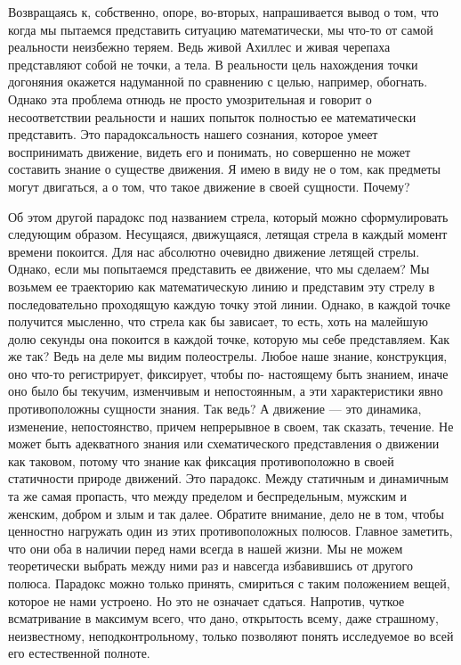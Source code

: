 Возвращаясь к, собственно, опоре, во-вторых, напрашивается вывод о том, что
когда мы пытаемся представить ситуацию математически, мы что-то от самой
реальности неизбежно теряем. Ведь живой Ахиллес и живая черепаха представляют
собой не точки, а тела. В реальности цель нахождения точки догоняния окажется
надуманной по сравнению с целью, например, обогнать. Однако эта проблема отнюдь
не просто умозрительная и говорит о несоответствии реальности и наших попыток
полностью ее математически представить. Это парадоксальность нашего сознания,
которое умеет воспринимать движение, видеть его и понимать, но совершенно не
может составить знание о существе движения. Я имею в виду не о том, как предметы
могут двигаться, а о том, что такое движение в своей сущности. Почему? 

Об этом
другой парадокс под названием стрела, который можно сформулировать следующим
образом. Несущаяся, движущаяся, летящая стрела в каждый момент времени покоится.
Для нас абсолютно очевидно движение летящей стрелы. Однако, если мы попытаемся
представить ее движение, что мы сделаем? Мы возьмем ее траекторию как
математическую линию и представим эту стрелу в последовательно проходящую каждую
точку этой линии. Однако, в каждой точке получится мысленно, что стрела как бы
зависает, то есть, хоть на малейшую долю секунды она покоится в каждой точке,
которую мы себе представляем. Как же так? Ведь на деле мы видим полеострелы.
Любое наше знание, конструкция, оно что-то регистрирует, фиксирует, чтобы по-
настоящему быть знанием, иначе оно было бы текучим, изменчивым и непостоянным, а
эти характеристики явно противоположны сущности знания. Так ведь? А движение —
это динамика, изменение, непостоянство, причем непрерывное в своем, так сказать,
течение. Не может быть адекватного знания или схематического представления о
движении как таковом, потому что знание как фиксация противоположно в своей
статичности природе движений. Это парадокс. Между статичным и динамичным та же
самая пропасть, что между пределом и беспредельным, мужским и женским, добром и
злым и так далее. Обратите внимание, дело не в том, чтобы ценностно нагружать
один из этих противоположных полюсов. Главное заметить, что они оба в наличии
перед нами всегда в нашей жизни. Мы не можем теоретически выбрать между ними раз
и навсегда избавившись от другого полюса. Парадокс можно только принять,
смириться с таким положением вещей, которое не нами устроено. Но это не означает
сдаться. Напротив, чуткое всматривание в максимум всего, что дано, открытость
всему, даже страшному, неизвестному, неподконтрольному, только позволяют понять
исследуемое во всей его естественной полноте. 

